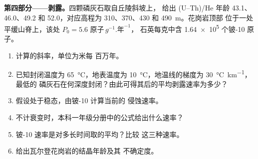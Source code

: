 \begin{problem}
\medskip\noindent\textbf{第四部分——剥露。}四颗磷灰石取自丘陵斜坡上，
给出 (U–Th)/He 年龄 43.1、46.0、49.2
和 \qty{52.0}{\Ma}，对应高程为 310、370、430 和 \qty{490}{m}。花岗岩顶部
位于一处平缓山脊上，该处 $P_0 = \num{5.6}\text{ 原子}\,\unit{g^{-1}.\text{年}^{-1}}$，
石英每克中含 \num{1.64e5} 个铍-10 原子。
\begin{enumerate}[resume]
\item 计算的斜率，单位为米每
百万年。
\item 已知封闭温度为 \qty{65}{\celsius}，地表温度为
\qty{10}{\celsius}，地温线的梯度为 \qty{30}{\celsius.km^{-1}}，最低的
磷灰石在何深度封闭？由此可得其后的平均剥露速率为多少？
\item 假设处于稳态，由铍-10 计算当前的
侵蚀速率。
\item 不计衰变时，本科一年级分册中的公式给出什么速率？
\item 铍-10 速率是对多长时间取的平均？比较
这三种速率。
\item 给出瓦尔登花岗岩的结晶年龄及其
不确定度。
\end{enumerate}
\end{problem}
